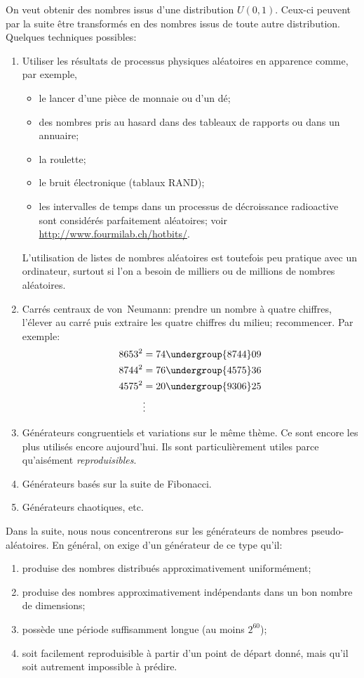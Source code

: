 On veut obtenir des nombres issus d'une distribution $U(0, 1)$.
Ceux-ci peuvent par la suite être transformés en des nombres issus de
toute autre distribution. Quelques techniques possibles:
\begin{enumerate}
\item Utiliser les résultats de processus physiques aléatoires en
  apparence comme, par exemple,
  \begin{itemize}
  \item le lancer d'une pièce de monnaie ou d'un dé;
  \item des nombres pris au hasard dans des tableaux de rapports ou
    dans un annuaire;
  \item la roulette;
  \item le bruit électronique (tablaux RAND);
  \item les intervalles de temps dans un processus de décroissance
    radioactive sont considérés parfaitement aléatoires; voir
    \url{http://www.fourmilab.ch/hotbits/}.
  \end{itemize}
  L'utilisation de listes de nombres aléatoires est toutefois peu
  pratique avec un ordinateur, surtout si l'on a besoin de milliers ou
  de millions de nombres aléatoires.
\item Carrés centraux de von~Neumann: prendre un nombre à quatre
  chiffres, l'élever au carré puis extraire les quatre chiffres du
  milieu; recommencer. Par exemple:
  \begin{align*}
    8653^2 &= 74\undergroup{8744}09 \\
    8744^2 &= 76\undergroup{4575}36 \\
    4575^2 &= 20\undergroup{9306}25 \\
    &\vdots
  \end{align*}
\item Générateurs congruentiels et variations sur le même thème. Ce
  sont encore les plus utilisés encore aujourd'hui. Ils sont
  particulièrement utiles parce qu'aisément \emph{reproduisibles}.
\item Générateurs basés sur la suite de Fibonacci.
\item Générateurs chaotiques, etc.
\end{enumerate}

Dans la suite, nous nous concentrerons sur les générateurs de nombres
pseudo-aléatoires. En général, on exige d'un générateur de ce type
qu'il:
\begin{enumerate}
\item produise des nombres distribués approximativement uniformément;
\item produise des nombres approximativement indépendants dans un bon
  nombre de dimensions;
\item possède une période suffisamment longue (au moins $2^{60}$);
\item soit facilement reproduisible à partir d'un point de départ
  donné, mais qu'il soit autrement impossible à prédire.
\end{enumerate}


